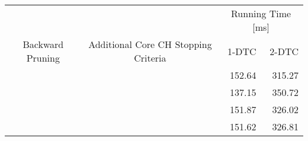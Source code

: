\begin{tabular}{ccrr}
	\toprule
	                 &                                      & \multicolumn{2}{c}{Running Time [\si{\milli\second}]}         \\
	Backward Pruning & Additional Core CH Stopping Criteria & 1-DTC                                                 & 2-DTC \\
	\midrule
	\xmark           & \xmark                               & 152.64                                                     & 315.27     \\
	\cmark           & \xmark                               & 137.15                                                     & 350.72     \\
	\xmark           & \cmark                               & 151.87                                                     & 326.02     \\
	\cmark           & \cmark                               & 151.62                                                     & 326.81     \\
	\bottomrule
\end{tabular}